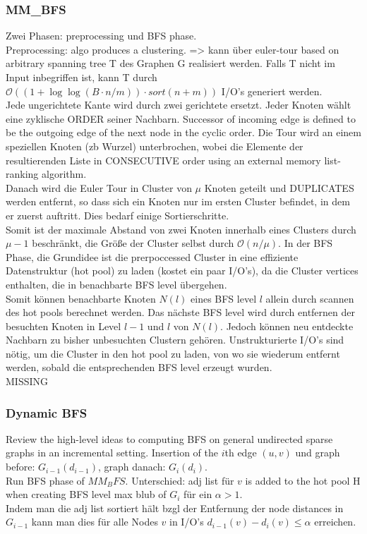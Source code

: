 \documentclass[12pt,a4paper,titlepage,xcolor=dvipsnames]{article}
\begin{document}
\subsubsection{MM_BFS}
Zwei Phasen: preprocessing und BFS phase.\\
Preprocessing: algo produces a clustering. => kann über euler-tour based on arbitrary spanning tree T des Graphen G realisiert werden. Falls T nicht im Input inbegriffen ist, kann T durch $\mathcal{O}((1+\log \log (B\cdot n/m))\cdot sort(n+m))$ I/O's generiert werden.\\
Jede ungerichtete Kante wird durch zwei gerichtete ersetzt. Jeder Knoten wählt eine zyklische ORDER seiner Nachbarn. Successor of incoming edge is defined to be the outgoing edge of the next node in the cyclic order. Die Tour wird an einem speziellen Knoten (zb Wurzel) unterbrochen, wobei die Elemente der resultierenden Liste in CONSECUTIVE order using an external memory list-ranking algorithm.\\
Danach wird die Euler Tour in Cluster von $\mu$ Knoten geteilt und DUPLICATES werden entfernt, so dass sich ein Knoten nur im ersten Cluster befindet, in dem er zuerst auftritt. Dies bedarf einige Sortierschritte.\\
Somit ist der maximale Abstand von zwei Knoten innerhalb eines Clusters durch $\mu -1$ beschränkt, die Größe der Cluster selbst durch $\mathcal{O}(n/\mu)$.
In der BFS Phase, die Grundidee ist die prerpoccessed Cluster in eine effiziente Datenstruktur (hot pool) zu laden (kostet ein paar I/O's), da die Cluster vertices enthalten, die in benachbarte BFS level übergehen.\\
Somit können benachbarte Knoten $N(l)$ eines BFS level $l$ allein durch scannen des hot pools berechnet werden. Das nächste BFS level wird durch entfernen der besuchten Knoten in Level $l-1$ und $l$ von $N(l)$. Jedoch können neu entdeckte Nachbarn zu bisher unbesuchten Clustern gehören. Unstrukturierte I/O's sind nötig, um die Cluster in den hot pool zu laden, von wo sie wiederum entfernt werden, sobald die entsprechenden BFS level erzeugt wurden.\\

MISSING

\subsubsection{Dynamic BFS}
Review the high-level ideas to computing BFS on general undirected sparse graphs in an incremental setting. Insertion of the $i$th edge $(u,v)$ und graph before: $G_{i-1}(d_{i-1})$, graph danach: $G_i(d_i)$.\\
Run BFS phase of $MM_BFS$. Unterschied: adj list für $v$ is added to the hot pool H when creating BFS level max blub of $G_i$ für ein $\alpha > 1$.\\
Indem man die adj list sortiert hält bzgl der Entfernung der node distances in $G_{i-1}$ kann man dies für alle Nodes $v$ in I/O's $d_{i-1}(v)-d_i(v)\leq \alpha$ erreichen.
\end{document}
